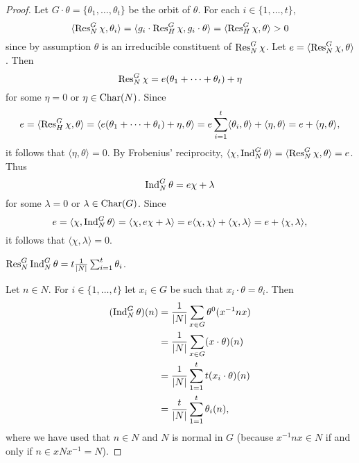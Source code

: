 \begin{proof}
    Let $G\cdot\theta=\{\theta_1,\dots,\theta_t\}$ be the 
    orbit of $\theta$. For each $i\in\{1,\dots,t\}$, 
    \[
    \langle\operatorname{Res}_N^G\chi,\theta_i\rangle 
    =\langle g_i\cdot \operatorname{Res}_H^G\chi,g_i\cdot\theta\rangle
    =\langle\operatorname{Res}_H^G\chi,\theta\rangle>0
    \]
    since by assumption $\theta$ is an irreducible constituent of $\operatorname{Res}_N^G\chi$. 
    Let $e=\langle\operatorname{Res}_N^G\chi,\theta\rangle$. Then 
    \[
    \operatorname{Res}_N^G\chi=e(\theta_1+\cdots+\theta_t)+\eta
    \]
    for some $\eta=0$ or $\eta\in\operatorname{Char}(N)$. Since 
    \[
    e=\langle\operatorname{Res}_H^G\chi,\theta\rangle
    =\langle e(\theta_1+\cdots+\theta_t)+\eta,\theta\rangle
    =e\sum_{i=1}^t\langle\theta_i,\theta\rangle+\langle\eta,\theta\rangle
    =e+\langle\eta,\theta\rangle,
    \]
    it follows that $\langle\eta,\theta\rangle=0$. By Frobenius' reciprocity, 
    $\langle\chi,\operatorname{Ind}_N^G\theta\rangle
    =\langle\operatorname{Res}_N^G\chi,\theta\rangle=e$.
    Thus 
    \[
    \operatorname{Ind}_N^G\theta=e\chi+\lambda 
    \]
    for some $\lambda=0$ or $\lambda\in\operatorname{Char}(G)$. Since 
    \[
    e=\langle\chi,\operatorname{Ind}_N^G\theta\rangle 
    =\langle\chi, e\chi+\lambda\rangle
    =e\langle\chi,\chi\rangle+\langle\chi,\lambda\rangle 
    =e+\langle\chi,\lambda\rangle,
    \]
    it follows that $\langle\chi,\lambda\rangle=0$.

    \begin{claim}
        $\operatorname{Res}_N^G\operatorname{Ind}_N^G\theta=t\frac{1}{|N|}\sum_{i=1}^t\theta_i$.
    \end{claim}

    Let $n\in N$. For $i\in\{1,\dots,t\}$ let 
    $x_i\in G$ be such that $x_i\cdot\theta=\theta_i$. Then 
    \begin{align*}
        (\operatorname{Ind}_N^G\theta)(n) &= \frac{1}{|N|}\sum_{x\in G}\theta^0(x^{-1}nx)\\
        &=\frac{1}{|N|}\sum_{x\in G}(x\cdot\theta)(n)\\
        &=\frac{1}{|N|}\sum_{1=1}^t t(x_i\cdot\theta)(n)\\
        &=\frac{t}{|N|}\sum_{1=1}^t \theta_i(n), 
    \end{align*}
    where we have used that $n\in N$ and $N$ is normal in $G$ (because $x^{-1}nx\in N$ if and only if
    $n\in xNx^{-1}=N$). 


\end{proof}

